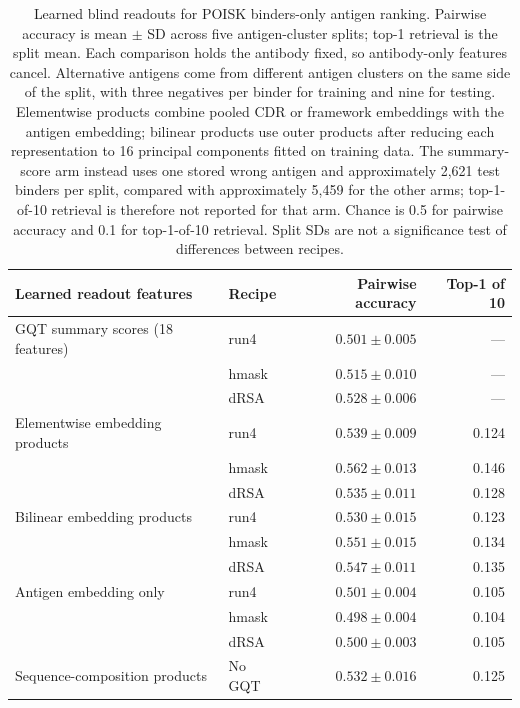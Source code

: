 \begin{table}[htbp]
    \centering
    \small
    \begin{tabularx}{\textwidth}{Xlrr}
        \toprule
        Learned readout features & Recipe & Pairwise accuracy & Top-1 of 10 \\
        \midrule
        GQT summary scores (18 features) & run4 & $0.501 \pm 0.005$ & --- \\
         & hmask & $0.515 \pm 0.010$ & --- \\
         & dRSA & $0.528 \pm 0.006$ & --- \\
        \addlinespace
        Elementwise embedding products & run4 & $0.539 \pm 0.009$ & 0.124 \\
         & hmask & $0.562 \pm 0.013$ & 0.146 \\
         & dRSA & $0.535 \pm 0.011$ & 0.128 \\
        \addlinespace
        Bilinear embedding products & run4 & $0.530 \pm 0.015$ & 0.123 \\
         & hmask & $0.551 \pm 0.015$ & 0.134 \\
         & dRSA & $0.547 \pm 0.011$ & 0.135 \\
        \addlinespace
        Antigen embedding only & run4 & $0.501 \pm 0.004$ & 0.105 \\
         & hmask & $0.498 \pm 0.004$ & 0.104 \\
         & dRSA & $0.500 \pm 0.003$ & 0.105 \\
        \addlinespace
        Sequence-composition products & No GQT & $0.532 \pm 0.016$ & 0.125 \\
        \bottomrule
    \end{tabularx}
    \caption[POISK binders-only antigen ranking]{Learned blind readouts for POISK binders-only antigen ranking. Pairwise accuracy is mean $\pm$ SD across five antigen-cluster splits; top-1 retrieval is the split mean. Each comparison holds the antibody fixed, so antibody-only features cancel. Alternative antigens come from different antigen clusters on the same side of the split, with three negatives per binder for training and nine for testing. Elementwise products combine pooled CDR or framework embeddings with the antigen embedding; bilinear products use outer products after reducing each representation to 16 principal components fitted on training data. The summary-score arm instead uses one stored wrong antigen and approximately 2,621 test binders per split, compared with approximately 5,459 for the other arms; top-1-of-10 retrieval is therefore not reported for that arm. Chance is 0.5 for pairwise accuracy and 0.1 for top-1-of-10 retrieval. Split SDs are not a significance test of differences between recipes.}
    \label{tab:jaxka-poisk-binders-only}
\end{table}


